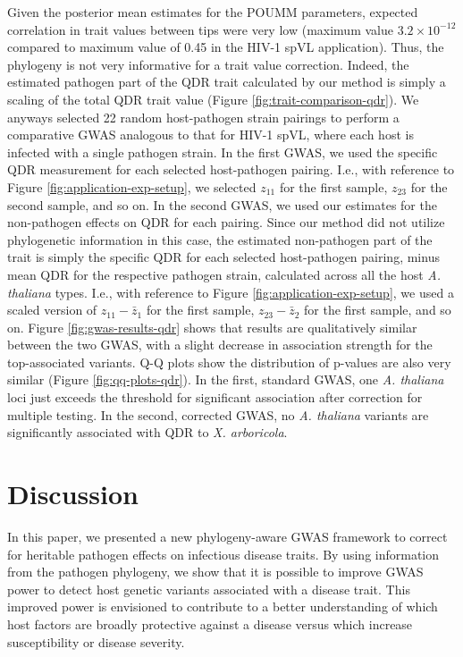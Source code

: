\documentclass[11pt]{article}
\begin{document}
\begin{linenumbers}
Given the posterior mean estimates for the POUMM parameters, expected correlation in trait values between tips were very low (maximum value $3.2 \times 10^{-12}$ compared to maximum value of 0.45 in the HIV-1 spVL application). Thus, the phylogeny is not very informative for a trait value correction. Indeed, the estimated pathogen part of the QDR trait calculated by our method is simply a scaling of the total QDR trait value (Figure \ref{fig:trait-comparison-qdr}). We anyways selected 22 random host-pathogen strain pairings to perform a comparative GWAS analogous to that for HIV-1 spVL, where each host is infected with a single pathogen strain. In the first GWAS, we used the specific QDR measurement for each selected host-pathogen pairing. I.e., with reference to Figure \ref{fig:application-exp-setup}, we selected $z_{11}$ for the first sample, $z_{23}$ for the second sample, and so on. In the second GWAS, we used our estimates for the non-pathogen effects on QDR for each pairing. Since our method did not utilize phylogenetic information in this case, the estimated non-pathogen part of the trait is simply the specific QDR for each selected host-pathogen pairing, minus mean QDR for the respective pathogen strain, calculated across all the host \emph{A. thaliana} types. I.e., with reference to Figure \ref{fig:application-exp-setup}, we used a scaled version of $z_{11} - \bar{z}_1$ for the first sample, $z_{23} - \bar{z}_2$ for the first sample, and so on. Figure \ref{fig:gwas-results-qdr} shows that results are qualitatively similar between the two GWAS, with a slight decrease in association strength for the top-associated variants. Q-Q plots show the distribution of p-values are also very similar (Figure \ref{fig:qq-plots-qdr}). In the first, standard GWAS, one \emph{A. thaliana} loci just exceeds the threshold for significant association after correction for multiple testing. In the second, corrected GWAS, no \emph{A. thaliana} variants are significantly associated with QDR to \emph{X. arboricola}.


\section*{Discussion}
In this paper, we presented a new phylogeny-aware GWAS framework to correct for heritable pathogen effects on infectious disease traits. By using information from the pathogen phylogeny, we show that it is possible to improve GWAS power to detect host genetic variants associated with a disease trait. This improved power is envisioned to contribute to a better understanding of which host factors are broadly protective against a disease versus which increase susceptibility or disease severity.


\end{linenumbers}
\end{document}
